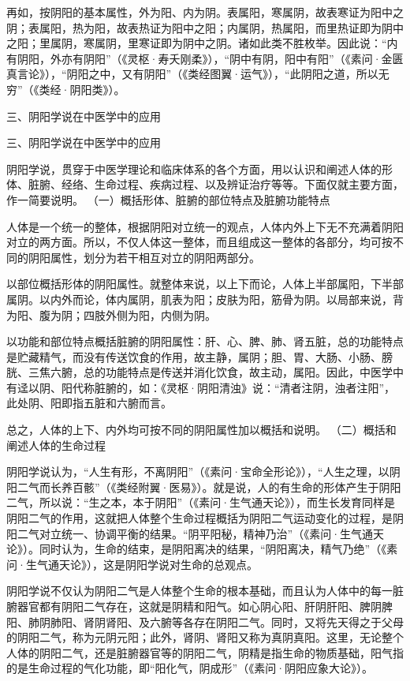 \documentclass[a4paper,12pt,UTF8,twoside]{ctexbook}
\begin{document}
再如，按阴阳的基本属性，外为阳、内为阴。表属阳，寒属阴，故表寒证为阳中之阴；表属阳，热为阳，故表热证为阳中之阳；内属阴，热属阳，而里热证即为阴中之阳；里属阴，寒属阴，里寒证即为阴中之阴。诸如此类不胜枚举。因此说：“内有阴阳，外亦有阴阳”（《灵枢·寿夭刚柔》），“阴中有阴，阳中有阳”（《素问·金匮真言论》），“阴阳之中，又有阴阳”（《类经图翼·运气》），“此阴阳之道，所以无穷”（《类经·阴阳类》）。

三、阴阳学说在中医学中的应用

三、阴阳学说在中医学中的应用

阴阳学说，贯穿于中医学理论和临床体系的各个方面，用以认识和阐述人体的形体、脏腑、经络、生命过程、疾病过程、以及辨证治疗等等。下面仅就主要方面，作一简要说明。
（一）概括形体、脏腑的部位特点及脏腑功能特点

人体是一个统一的整体，根据阴阳对立统一的观点，人体内外上下无不充满着阴阳对立的两方面。所以，不仅人体这一整体，而且组成这一整体的各部分，均可按不同的阴阳属性，划分为若干相互对立的阴阳两部分。

以部位概括形体的阴阳属性。就整体来说，以上下而论，人体上半部属阳，下半部属阴。以内外而论，体内属阴，肌表为阳；皮肤为阳，筋骨为阴。以局部来说，背为阳、腹为阴；四肢外侧为阳，内侧为阴。

以功能和部位特点概括脏腑的阴阳属性：肝、心、脾、肺、肾五脏，总的功能特点是贮藏精气，而没有传送饮食的作用，故主静，属阴；胆、胃、大肠、小肠、膀胱、三焦六腑，总的功能特点是传送并消化饮食，故主动，属阳。因此，中医学中有迳以阴、阳代称脏腑的，如：《灵枢·阴阳清浊》说：“清者注阴，浊者注阳”，此处阴、阳即指五脏和六腑而言。

总之，人体的上下、内外均可按不同的阴阳属性加以概括和说明。
（二）概括和阐述人体的生命过程

阴阳学说认为，“人生有形，不离阴阳”（《素问·宝命全形论》），“人生之理，以阴阳二气而长养百骸”（《类经附翼·医易》）。就是说，人的有生命的形体产生于阴阳二气，所以说：“生之本，本于阴阳”（《素问·生气通天论》），而生长发育同样是阴阳二气的作用，这就把人体整个生命过程概括为阴阳二气运动变化的过程，是阴阳二气对立统一、协调平衡的结果。“阴平阳秘，精神乃治”（《素问·生气通天论》）。同时认为，生命的结束，是阴阳离决的结果，“阴阳离决，精气乃绝”（《素问·生气通天论》），这是阴阳学说对生命的总观点。

阴阳学说不仅认为阴阳二气是人体整个生命的根本基础，而且认为人体中的每一脏腑器官都有阴阳二气存在，这就是阴精和阳气。如心阴心阳、肝阴肝阳、脾阴脾阳、肺阴肺阳、肾阴肾阳、及六腑等各存在阴阳二气。同时，又将先天得之于父母的阴阳二气，称为元阴元阳；此外，肾阴、肾阳又称为真阴真阳。这里，无论整个人体的阴阳二气，还是脏腑器官等的阴阳二气，阴精是指生命的物质基础，阳气指的是生命过程的气化功能，即“阳化气，阴成形”（《素问·阴阳应象大论》）。
\end{document}
